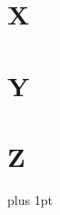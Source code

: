 \documentclass[]{memoir}
\begin{document}
\begin{multicols}{2}
\section*{X}


\section*{Y}


\section*{Z}


\end{multicols}
\parskip=0pt plus 1pt
\restoregeometry
\pagebreak


\cleardoublepage
{}
\setlength{\columnsep}{0.75cm}
\printindex

\end{document}

